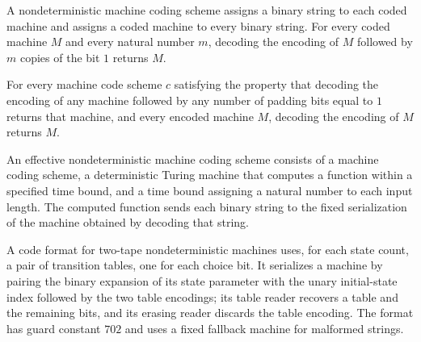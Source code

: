 \begin{definition}
\label{Turing.NDMachineCode}
\leanok
{}
A nondeterministic machine coding scheme assigns a binary string to each coded machine
and assigns a coded machine to every binary string. For every coded machine $M$ and
every natural number $m$, decoding the encoding of $M$ followed by $m$ copies of the bit
$1$ returns $M$.
\end{definition}

\begin{theorem}
\label{Turing.NDMachineCode.decode_encode}
\leanok
{}
For every machine code scheme $c$ satisfying the property that decoding the encoding of
any machine followed by any number of padding bits equal to $1$ returns that machine,
and every encoded machine $M$, decoding the encoding of $M$ returns $M$.
\end{theorem}

\begin{definition}
\label{Turing.EffectiveNDMachineCode}
\leanok
{}
An effective nondeterministic machine coding scheme consists of a machine coding scheme,
a deterministic Turing machine that computes a function within a specified time bound,
and a time bound assigning a natural number to each input length. The computed function
sends each binary string to the fixed serialization of the machine obtained by decoding
that string.
\end{definition}

\begin{definition}
\label{Turing.ndFormat}
\leanok
{}
A code format for two-tape nondeterministic machines uses, for each state count, a pair
of transition tables, one for each choice bit. It serializes a machine by pairing the
binary expansion of its state parameter with the unary initial-state index followed by
the two table encodings; its table reader recovers a table and the remaining bits, and
its erasing reader discards the table encoding. The format has guard constant $702$ and
uses a fixed fallback machine for malformed strings.
\end{definition}

